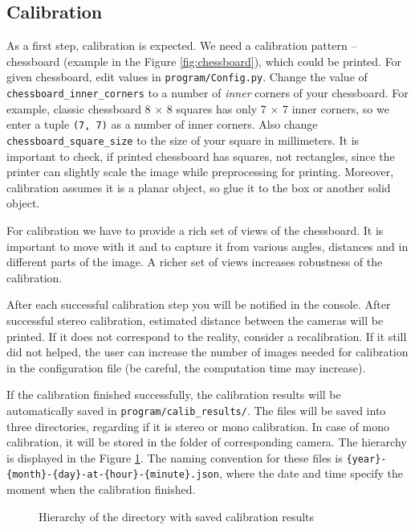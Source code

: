 \subsection{Calibration}
As a first step, calibration is expected. We need a calibration pattern --
chessboard (example in the Figure \ref{fig:chessboard}), which could be
printed. For given chessboard, edit values in \verb+program/Config.py+. Change
the value of \verb+chessboard_inner_corners+ to a number of \emph{inner}
corners of your chessboard. For example, classic chessboard 8 $\times$ 8
squares has only 7 $\times$ 7 inner corners, so we enter a tuple \verb+(7, 7)+
as a number of inner corners. Also change \verb+chessboard_square_size+ to the
size of your square in millimeters. It is important to check, if printed
chessboard has squares, not rectangles, since the printer can slightly scale
the image while preprocessing for printing.  Moreover, calibration assumes it
is a planar object, so glue it to the box or another solid object.

For calibration we have to provide a rich set of views of the chessboard. It is important
to move with it and to capture it from various angles, distances and in different
parts of the image. A richer set of views increases robustness of the calibration.

After each successful calibration step you will be notified in the console.
After successful stereo calibration, estimated distance between the cameras
will be printed. If it does not correspond to the reality, consider
a recalibration. If it still did not helped, the user can increase the number of
images needed for calibration in the configuration file (be careful, the computation
time may increase).

If the calibration finished successfully, the calibration results will be
automatically saved in \verb+program/calib_results/+. The files will be saved
into three directories, regarding if it is stereo or mono calibration. In case
of mono calibration, it will be stored in the folder of corresponding camera.
The hierarchy is displayed in the Figure \ref{fig:hierarchy-calib}. The naming
convention for these files is
\verb+{year}-{month}-{day}-at-{hour}-{minute}.json+, where the date and time
specify the moment when the calibration finished.

\begin{figure}
 \caption{Hierarchy of the directory with saved calibration results}
 \label{fig:hierarchy-calib}
\end{figure}

